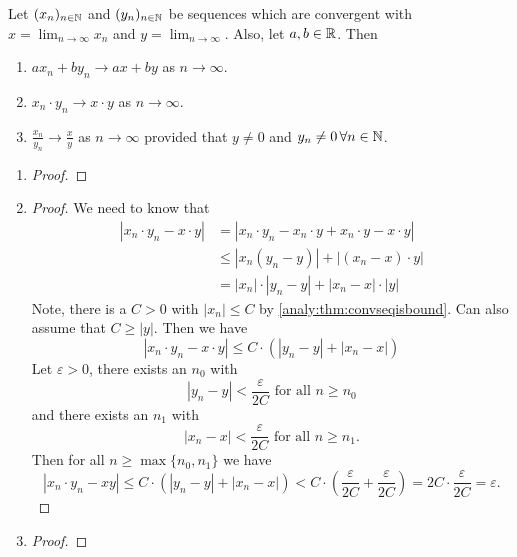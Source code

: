 \documentclass[10pt, a4paper]{article}
\newcommand{\seq}[1][x]{(#1_n)_{n \in \N}}
\begin{document}
\begin{theorem}\label{analy:thm:COLT}
    Let $\seq$ and $\seq[y]$ be sequences which are convergent with $x = \lim_{n \rightarrow \infty}x_n$ and $y = \lim_{n \rightarrow \infty}$.
    Also, let $a, b \in \mathbb{R}$.
    Then
    \begin{enumerate}[label = (\alph*)]
        \item $ax_n + by_n \rightarrow ax + by$ as $n \rightarrow \infty$.
        \item $x_n \cdot y_n \rightarrow x \cdot y$ as $n \rightarrow \infty$.
        \item $\frac{x_n}{y_n} \rightarrow \frac{x}{y}$ as $n \rightarrow \infty$ provided that $y \neq 0$ and $y_n \neq 0\,\forall n \in \mathbb{N}$.
    \end{enumerate}
    \begin{enumerate}[label = (\alph*)]
        \item
        \begin{proof}
        \end{proof}
        \item 
        \begin{proof}
        We need to know that
        \begin{align*}
        |x_n \cdot y_n - x \cdot y| &= |x_n \cdot y_n - x_n \cdot y + x_n \cdot y - x \cdot y| \\
        &\leq |x_n (y_n - y)| + |(x_n - x)\cdot y| \\
        &= |x_n| \cdot |y_n - y| + |x_n - x| \cdot |y|
        \end{align*}
        Note,
        there is a $C > 0$ with $|x_n| \leq C$ by \autoref{analy:thm:convseqisbound}.
        Can also assume that $C \geq |y|$.
        Then we have
        \[
        |x_n \cdot y_n - x \cdot y| \leq C \cdot (|y_n - y| + |x_n - x|)
        \]
        Let $\varepsilon > 0$,
        there exists an $n_0$ with
        \[
        |y_n - y| < \frac{\varepsilon}{2C}\text{ for all } n \geq n_0
        \]
        and there exists an $n_1$ with
        \[
        |x_n - x| < \frac{\varepsilon}{2C}\text{ for all } n \geq n_1.
        \]
        Then for all $n \geq \max\{n_0, n_1\}$ we have
        \[
        |x_n \cdot y_n - xy| \leq C \cdot (|y_n - y| + |x_n - x|) < C \cdot (\frac{\varepsilon}{2C} + \frac{\varepsilon}{2C}) = 2C \cdot \frac{\varepsilon}{2C} = \varepsilon.
        \]
        \end{proof}
        \item
        \begin{proof}
        \end{proof}
    \end{enumerate}
\end{theorem}
\end{document}
